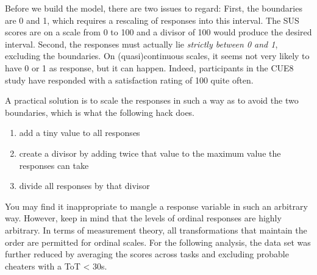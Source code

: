 \documentclass[]{svmono}
\providecommand{\tightlist}{%
  \setlength{\itemsep}{0pt}\setlength{\parskip}{0pt}}
\begin{document}
Before we build the model, there are two issues to regard: First, the
boundaries are 0 and 1, which requires a rescaling of responses into
this interval. The SUS scores are on a scale from 0 to 100 and a divisor
of 100 would produce the desired interval. Second, the responses must
actually lie \emph{strictly between 0 and 1}, excluding the boundaries.
On (quasi)continuous scales, it seems not very likely to have 0 or 1 as
response, but it can happen. Indeed, participants in the CUE8 study have
responded with a satisfaction rating of 100 quite often.

A practical solution is to scale the responses in such a way as to avoid
the two boundaries, which is what the following hack does.

\begin{enumerate}
\def\labelenumi{\arabic{enumi}.}
\tightlist
\item
  add a tiny value to all responses
\item
  create a divisor by adding twice that value to the maximum value the
  responses can take
\item
  divide all responses by that divisor
\end{enumerate}

You may find it inappropriate to mangle a response variable in such an
arbitrary way. However, keep in mind that the levels of ordinal
responses are highly arbitrary. In terms of measurement theory, all
transformations that maintain the order are permitted for ordinal
scales. For the following analysis, the data set was further reduced by
averaging the scores across tasks and excluding probable cheaters with a
ToT \textless{} 30s.
\end{document}
